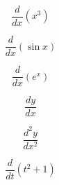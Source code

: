 \documentclass{article}
\begin{document}
\[
\frac{d}{dx}(x^3)
\]

\[
\frac{d}{dx}(\sin x)
\]

\[
\frac{d}{dx}(e^x)
\]

\[
\frac{dy}{dx}
\]

\[
\frac{d^2y}{dx^2}
\]

\[
\frac{d}{dt}(t^2+1)
\]
\end{document}
